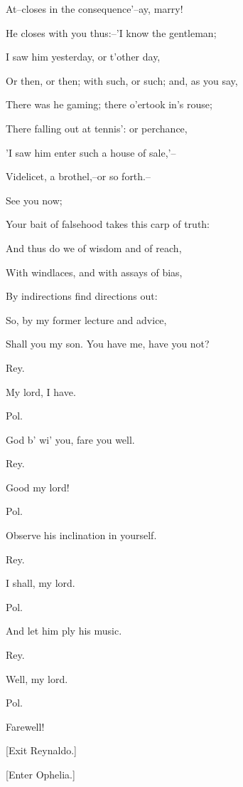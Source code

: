 \documentclass[12pt]{book}
\begin{document}
At--closes in the consequence'--ay, marry!

He closes with you thus:--'I know the gentleman;

I saw him yesterday, or t'other day,

Or then, or then; with such, or such; and, as you say,

There was he gaming; there o'ertook in's rouse;

There falling out at tennis': or perchance,

'I saw him enter such a house of sale,'--

Videlicet, a brothel,--or so forth.--

See you now;

Your bait of falsehood takes this carp of truth:

And thus do we of wisdom and of reach,

With windlaces, and with assays of bias,

By indirections find directions out:

So, by my former lecture and advice,

Shall you my son. You have me, have you not?



Rey.

My lord, I have.



Pol.

God b' wi' you, fare you well.



Rey.

Good my lord!



Pol.

Observe his inclination in yourself.



Rey.

I shall, my lord.



Pol.

And let him ply his music.



Rey.

Well, my lord.



Pol.

Farewell!



[Exit Reynaldo.]



[Enter Ophelia.]
\end{document}
